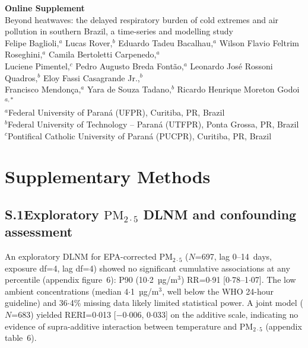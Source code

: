 \documentclass[12pt]{article}
\begin{document}
\begin{center}
{\Large\bfseries Online Supplement}\\[0.5em]
{\large Beyond heatwaves: the delayed respiratory burden of cold extremes
and air pollution in southern Brazil, a time-series and modelling study}\\[0.5em]
Felipe Baglioli,$^{a}$ Lucas Rover,$^{b}$ Eduardo Tadeu Bacalhau,$^{a}$
Wilson Flavio Feltrim Roseghini,$^{a}$ Camila Bertoletti Carpenedo,$^{a}$\\
Luciene Pimentel,$^{c}$ Pedro Augusto Breda Font\~{a}o,$^{a}$
Leonardo Jos\'{e} Rossoni Quadros,$^{b}$ Eloy Fassi Casagrande Jr.,$^{b}$\\
Francisco Mendon\c{c}a,$^{a}$ Yara de Souza Tadano,$^{b}$ Ricardo Henrique Moreton Godoi$^{a,*}$\\[0.3em]
{\small $^{a}$Federal University of Paran\'{a} (UFPR), Curitiba, PR, Brazil}\\
{\small $^{b}$Federal University of Technology -- Paran\'{a} (UTFPR), Ponta Grossa, PR, Brazil}\\
{\small $^{c}$Pontifical Catholic University of Paran\'{a} (PUCPR), Curitiba, PR, Brazil}
\end{center}

\bigskip

\section*{Supplementary Methods}

\subsection*{S.1\quad Exploratory $\text{PM}_{2{\cdot}5}$ DLNM and confounding assessment}

An exploratory DLNM for EPA-corrected $\text{PM}_{2{\cdot}5}$ ($N$=697,
lag 0--14~days, exposure df=4, lag df=4) showed no significant
cumulative associations at any percentile (appendix figure~6): P90
(10${\cdot}$2~µg/m$^3$) RR=0${\cdot}$91 [0${\cdot}$78--1${\cdot}$07].
The low ambient concentrations (median 4${\cdot}$1~µg/m$^3$, well
below the WHO 24-hour guideline) and 36${\cdot}$4\% missing data
likely limited statistical power. A joint model ($N$=683) yielded
RERI=0${\cdot}$013 [$-$0${\cdot}$006, 0${\cdot}$033] on the additive
scale, indicating no evidence of supra-additive interaction between
temperature and $\text{PM}_{2{\cdot}5}$ (appendix table~6).
\end{document}
